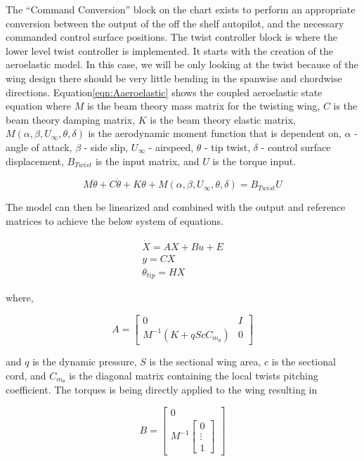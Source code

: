 \documentclass[11pt]{ucthesis}
\begin{document}
The ``Command Conversion'' block on the chart exists to perform an appropriate conversion between the output of the off the shelf autopilot, and the necessary commanded control surface positions. The twist controller block is where the lower level twist controller is implemented. It starts with the creation of the aeroelastic model. In this case, we will be only looking at the twist because of the wing design there should be very little bending in the spanwise and chordwise directions. Equation\ref{eqn:Aaeroelastic} shows the coupled aeroelastic state equation where $M$ is the beam theory mass matrix for the twisting wing, $C$ is the beam theory damping matrix, $K$ is the beam theory elastic matrix, $M(\alpha,\beta,U_{\infty},\theta,\delta)$ is the aerodynamic moment function that is dependent on, $\alpha$ - angle of attack, $\beta$ - side slip, $U_{\infty}$ - airspeed, $\theta$ - tip twist, $\delta$ - control surface displacement, $B_{Twist}$ is the input matrix, and $U$ is the torque input.

\begin{equation}
M \ddot{\theta} + C \dot{\theta} +K\theta+M(\alpha,\beta,U_{\infty},\theta,\delta) = B_{Twist}U
\label{eqn:Aaeroelastic}
\end{equation}

The model can then be linearized and combined with the output and reference matrices to achieve the below system of equations.

\begin{equation}
\begin{matrix}
\dot{X} = AX + Bu+E\\
y = CX\\
\theta_{tip} = HX
\end{matrix}
\label{eqn:Asys}
\end{equation}

where,

\begin{equation}
A = \begin{bmatrix}
0&I\\
M^{-1}(K+qScC_{m_{\theta}})&0
\end{bmatrix}
\end{equation}

and $q$ is the dynamic pressure, $S$ is the sectional wing area, $c$ is the sectional cord, and $C_{m_{\theta}}$ is the diagonal matrix containing the local twists pitching coefficient. The torques is being directly applied to the wing resulting in 

\begin{equation}
B = \begin{bmatrix}
0\\
M^{-1}\begin{bmatrix}
0\\\vdots\\1\end{bmatrix}
\end{bmatrix}
\end{equation}
\end{document}
